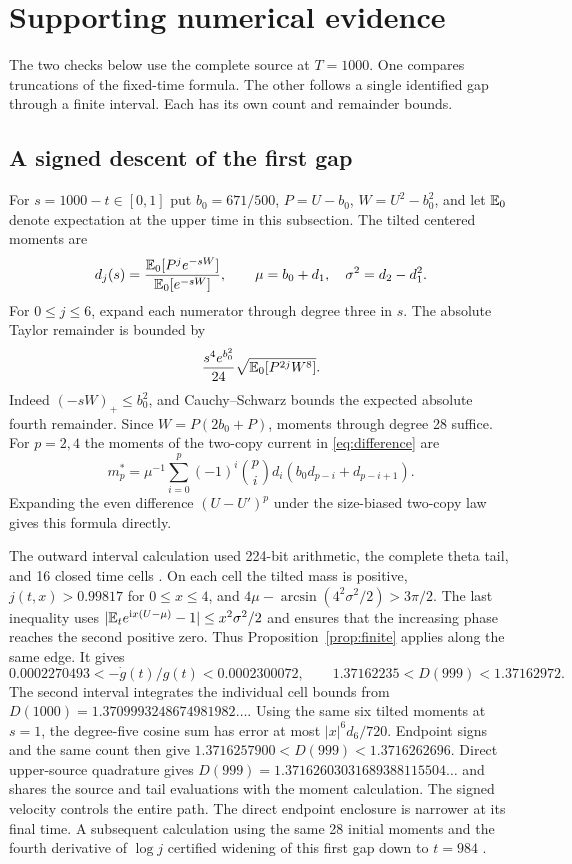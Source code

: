 \section{Supporting numerical evidence}\label{sec:finite}

The two checks below use the complete source at \(T=1000\). One compares
truncations of the fixed-time formula. The other follows a single
identified gap through a finite interval. Each has its own count
and remainder bounds.



\subsection{A signed descent of the first gap}

For \(s=1000-t\in[0,1]\) put \(b_0=671/500\),
\(P=U-b_0\), \(W=U^2-b_0^2\), and let \(\mathbb E_0\) denote expectation at
the upper time in this subsection. The tilted centered moments are
\begin{equation}
 d_j(s)=\frac{\mathbb E_0[P^je^{-sW}]}{\mathbb E_0[e^{-sW}]},\qquad
 \mu=b_0+d_1,\quad \sigma^2=d_2-d_1^2 .\label{eq:tilt}
\end{equation}
For \(0\le j\le6\), expand each numerator through degree three in \(s\).
The absolute Taylor remainder is bounded by
\[
 \frac{s^4e^{b_0^2}}{24}\sqrt{\mathbb E_0[P^{2j}W^8]}.
\]
Indeed \((-sW)_+\le b_0^2\), and Cauchy--Schwarz bounds the expected
absolute fourth remainder. Since \(W=P(2b_0+P)\), moments through
degree 28 suffice. For \(p=2,4\) the moments of the two-copy current in
\eqref{eq:difference} are
\[
 m_p^*=\mu^{-1}\sum_{i=0}^p(-1)^i\binom pi d_i
                 (b_0d_{p-i}+d_{p-i+1}).
\]
Expanding the even difference \((U-U')^p\) under the size-biased
two-copy law gives this formula directly.

The outward interval calculation used 224-bit arithmetic, the complete
theta tail, and 16 closed time cells \cite{FiniteRecord}. On each cell
the tilted mass is positive, \(j(t,x)>0.99817\) for \(0\le x\le4\),
and \(4\mu-\arcsin(4^2\sigma^2/2)>3\pi/2\).
The last inequality uses
\(|\mathbb E_t e^{\mathrm i x(U-\mu)}-1|\le x^2\sigma^2/2\) and ensures that the
increasing phase reaches the second positive zero. Thus
Proposition~\ref{prop:finite} applies along the same edge. It gives
\[
 0.0002270493<-\dot g(t)/g(t)<0.0002300072,\qquad
 1.37162235<D(999)<1.37162972 .
\]
The second interval integrates the individual cell bounds from
\(D(1000)=1.3709993248674981982\ldots\).
Using the same six tilted moments at \(s=1\), the degree-five cosine
sum has error at most \(|x|^6d_6/720\). Endpoint signs and the same count
then give \(1.3716257900<D(999)<1.3716262696\). Direct upper-source
quadrature gives \(D(999)=1.37162603031689388115504\ldots\) and shares
the source and tail evaluations with the moment calculation. The signed
velocity controls the entire path. The direct endpoint enclosure is
narrower at its final time. A subsequent calculation using the same 28
initial moments and the fourth derivative of \(\log j\) certified
widening of this first gap down to \(t=984\) \cite{EZJoined}.
